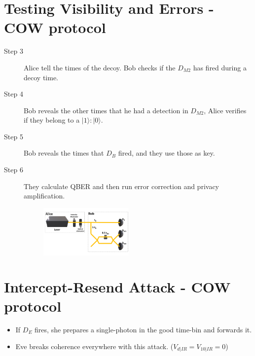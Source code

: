 \documentclass[1000pt]{article}
\newcommand{\mysection}[1]{\section*{\color{black}\sffamily #1}}%
\begin{document}

\mysection{\Huge\textbf{Testing Visibility and Errors - COW protocol}} \Large \vspace*{1cm}
\begin{description}

\item [Step 3] Alice tell the times of the decoy. Bob checks if the $D_{M2}$ has fired during a decoy time.

\item [Step 4] Bob reveals the other times that he had a detection in $D_{M2}$, Alice verifies if they belong to a $|1\rangle:|0\rangle$.

\item [Step 5] Bob reveals the times that $D_B$ fired, and they use those as key.

\item [Step 6] They calculate QBER and then run error correction and privacy amplification.

\begin{figure}[hbt]
    	\centering
    	\includegraphics[width=0.45\textwidth]{./figures/Full2.pdf}
    \end{figure}
\end{description}
\iffalse

\mysection{\Huge\textbf{Intercept-Resend Attack - COW protocol}} \large \vspace*{1cm}
\begin{itemize}
	\item If $D_E$ fires, she prepares a single-photon in the good time-bin and forwards it.
	\item Eve breaks coherence everywhere with this attack. ($V_{d|IR} = V_{10|IR} =0$)
\end{itemize}
\end{document}
